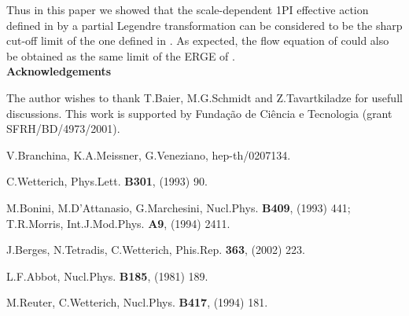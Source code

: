 \documentclass[a4paper,12pt]{article}
\begin{document}
Thus in this paper we showed that the scale-dependent 1PI effective action defined in \cite{Bra02} by a partial Legendre transformation can be considered to be the sharp cut-off limit of the one defined in \cite{wet93,bon93}. As expected, the flow equation of \cite{Bra02} could also be obtained as the same limit of the ERGE of \cite{wet93,bon93}.\\

{\bf Acknowledgements} 

The author wishes to thank T.Baier, M.G.Schmidt and Z.Tavartkiladze for usefull discussions. This work is supported by Funda\c c\~ ao de Ci\^ encia e Tecnologia (grant SFRH/BD/4973/2001).

\begin{thebibliography}{}

 V.Branchina, K.A.Meissner, G.Veneziano, hep-th/0207134.

 C.Wetterich, Phys.Lett. {\bf B301}, (1993) 90.

 M.Bonini, M.D'Attanasio, G.Marchesini, Nucl.Phys. {\bf B409}, (1993) 441; T.R.Morris, Int.J.Mod.Phys. {\bf A9}, (1994) 2411.

 J.Berges, N.Tetradis, C.Wetterich, Phis.Rep. {\bf 363}, (2002) 223.

 L.F.Abbot, Nucl.Phys. {\bf B185}, (1981) 189.

 M.Reuter, C.Wetterich, Nucl.Phys. {\bf B417}, (1994) 181.

\end{thebibliography}
\end{document}
